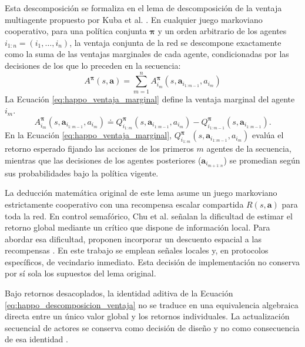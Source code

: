 Esta descomposición se formaliza en el lema de descomposición de la ventaja multiagente propuesto por Kuba et al. \cite{kuba2021trust}. En cualquier juego markoviano cooperativo, para una política conjunta $\boldsymbol{\pi}$ y un orden arbitrario de los agentes $i_{1:n} = (i_1, \dots, i_n)$, la ventaja conjunta de la red se descompone exactamente como la suma de las ventajas marginales de cada agente, condicionadas por las decisiones de los que lo preceden en la secuencia:
\begin{equation}
    A^{\boldsymbol{\pi}}(s, \mathbf{a}) = \sum_{m=1}^n A_{i_m}^{\boldsymbol{\pi}}(s, \mathbf{a}_{i_{1:m-1}}, a_{i_m})
    \label{eq:happo_descomposicion_ventaja}
\end{equation}
La Ecuación \eqref{eq:happo_ventaja_marginal} define la ventaja marginal del agente $i_m$.
\begin{equation}
    A_{i_m}^{\boldsymbol{\pi}}(s, \mathbf{a}_{i_{1:m-1}}, a_{i_m}) \doteq Q_{i_{1:m}}^{\boldsymbol{\pi}}(s, \mathbf{a}_{i_{1:m-1}}, a_{i_m}) - Q_{i_{1:m-1}}^{\boldsymbol{\pi}}(s, \mathbf{a}_{i_{1:m-1}}).
    \label{eq:happo_ventaja_marginal}
\end{equation}
En la Ecuación \eqref{eq:happo_ventaja_marginal}, $Q_{i_{1:m}}^{\boldsymbol{\pi}}(s, \mathbf{a}_{i_{1:m-1}}, a_{i_m})$ evalúa el retorno esperado fijando las acciones de los primeros $m$ agentes de la secuencia, mientras que las decisiones de los agentes posteriores ($\mathbf{a}_{i_{m+1:n}}$) se promedian según sus probabilidades bajo la política vigente.

La deducción matemática original de este lema asume un juego markoviano estrictamente cooperativo con una recompensa escalar compartida $R(s, \mathbf{a})$ para toda la red. En control semafórico, Chu et al. señalan la dificultad de estimar el retorno global mediante un crítico que dispone de información local. Para abordar esa dificultad, proponen incorporar un descuento espacial a las recompensas \cite{Chu2019}. En este trabajo se emplean señales locales y, en protocolos específicos, de vecindario inmediato. Esta decisión de implementación no conserva por sí sola los supuestos del lema original.

Bajo retornos desacoplados, la identidad aditiva de la Ecuación \eqref{eq:happo_descomposicion_ventaja} no se traduce en una equivalencia algebraica directa entre un único valor global y los retornos individuales. La actualización secuencial de actores se conserva como decisión de diseño y no como consecuencia de esa identidad \cite{wang2023order}.

